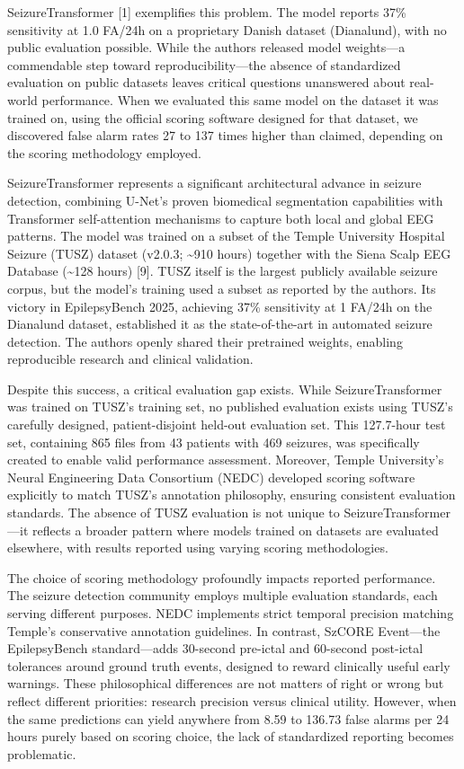 \documentclass[
]{article}
\begin{document}
SeizureTransformer {[}1{]} exemplifies this problem. The model reports
37\% sensitivity at 1.0 FA/24h on a proprietary Danish dataset
(Dianalund), with no public evaluation possible. While the authors
released model weights---a commendable step toward reproducibility---the
absence of standardized evaluation on public datasets leaves critical
questions unanswered about real-world performance. When we evaluated
this same model on the dataset it was trained on, using the official
scoring software designed for that dataset, we discovered false alarm
rates 27 to 137 times higher than claimed, depending on the scoring
methodology employed.

SeizureTransformer represents a significant architectural advance in
seizure detection, combining U-Net's proven biomedical segmentation
capabilities with Transformer self-attention mechanisms to capture both
local and global EEG patterns. The model was trained on a subset of the
Temple University Hospital Seizure (TUSZ) dataset (v2.0.3;
\textasciitilde910 hours) together with the Siena Scalp EEG Database
(\textasciitilde128 hours) {[}9{]}. TUSZ itself is the largest publicly
available seizure corpus, but the model's training used a subset as
reported by the authors. Its victory in EpilepsyBench 2025, achieving
37\% sensitivity at 1 FA/24h on the Dianalund dataset, established it as
the state-of-the-art in automated seizure detection. The authors openly
shared their pretrained weights, enabling reproducible research and
clinical validation.

Despite this success, a critical evaluation gap exists. While
SeizureTransformer was trained on TUSZ's training set, no published
evaluation exists using TUSZ's carefully designed, patient-disjoint
held-out evaluation set. This 127.7-hour test set, containing 865 files
from 43 patients with 469 seizures, was specifically created to enable
valid performance assessment. Moreover, Temple University's Neural
Engineering Data Consortium (NEDC) developed scoring software explicitly
to match TUSZ's annotation philosophy, ensuring consistent evaluation
standards. The absence of TUSZ evaluation is not unique to
SeizureTransformer---it reflects a broader pattern where models trained
on datasets are evaluated elsewhere, with results reported using varying
scoring methodologies.

The choice of scoring methodology profoundly impacts reported
performance. The seizure detection community employs multiple evaluation
standards, each serving different purposes. NEDC implements strict
temporal precision matching Temple's conservative annotation guidelines.
In contrast, SzCORE Event---the EpilepsyBench standard---adds 30-second
pre-ictal and 60-second post-ictal tolerances around ground truth
events, designed to reward clinically useful early warnings. These
philosophical differences are not matters of right or wrong but reflect
different priorities: research precision versus clinical utility.
However, when the same predictions can yield anywhere from 8.59 to
136.73 false alarms per 24 hours purely based on scoring choice, the
lack of standardized reporting becomes problematic.
\end{document}
